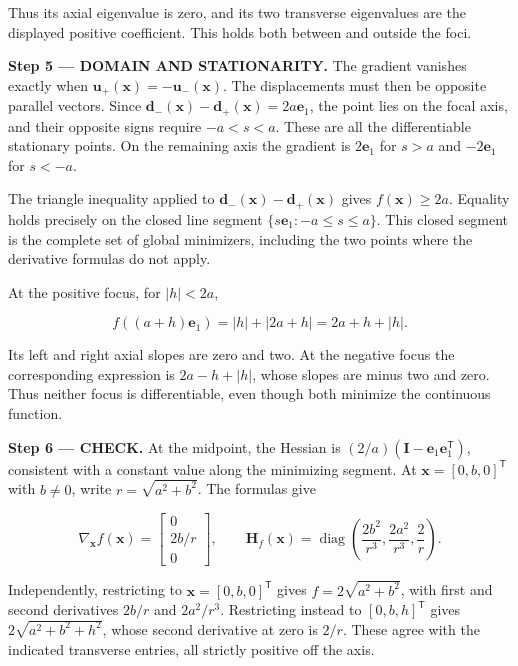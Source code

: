 \documentclass[11pt,oneside,openany]{book}
\begin{document}
Thus its axial eigenvalue is zero, and its two transverse eigenvalues are the displayed positive coefficient. This holds both between and outside the foci.

\endgroup
\begin{DomainStep}
\textbf{Step 5 --- DOMAIN AND STATIONARITY.} The gradient vanishes exactly when \(\mathbf u_+(\mathbf x)=-\mathbf u_-(\mathbf x)\). The displacements must then be opposite parallel vectors. Since \(\mathbf d_-(\mathbf x)-\mathbf d_+(\mathbf x)=2a\mathbf e_1\), the point lies on the focal axis, and their opposite signs require \(-a<s<a\). These are all the differentiable stationary points. On the remaining axis the gradient is \(2\mathbf e_1\) for \(s>a\) and \(-2\mathbf e_1\) for \(s<-a\).

The triangle inequality applied to \(\mathbf d_-(\mathbf x)-\mathbf d_+(\mathbf x)\) gives \(f(\mathbf x)\ge2a\). Equality holds precisely on the closed line segment \(\{s\mathbf e_1:-a\le s\le a\}\). This closed segment is the complete set of global minimizers, including the two points where the derivative formulas do not apply.

At the positive focus, for \(|h|<2a\),

\[
f((a+h)\mathbf e_1)=|h|+|2a+h|=2a+h+|h|.
\]

Its left and right axial slopes are zero and two. At the negative focus the corresponding expression is \(2a-h+|h|\), whose slopes are minus two and zero. Thus neither focus is differentiable, even though both minimize the continuous function.

\end{DomainStep}
\textbf{Step 6 --- CHECK.} At the midpoint, the Hessian is \((2/a)(\mathbf I-\mathbf e_1\mathbf e_1^{\mathsf T})\), consistent with a constant value along the minimizing segment. At \(\mathbf x=[0,b,0]^{\mathsf T}\) with \(b\ne0\), write \(r=\sqrt{a^2+b^2}\). The formulas give

\[
\nabla_{\mathbf x}f(\mathbf x)=\begin{bmatrix}0\\2b/r\\0\end{bmatrix},\qquad
\mathbf H_f(\mathbf x)=\operatorname{diag}\left(\frac{2b^2}{r^3},\frac{2a^2}{r^3},\frac2r\right).
\]

Independently, restricting to \(\mathbf x=[0,b,0]^{\mathsf T}\) gives \(f=2\sqrt{a^2+b^2}\), with first and second derivatives \(2b/r\) and \(2a^2/r^3\). Restricting instead to \([0,b,h]^{\mathsf T}\) gives \(2\sqrt{a^2+b^2+h^2}\), whose second derivative at zero is \(2/r\). These agree with the indicated transverse entries, all strictly positive off the axis.
\end{document}
